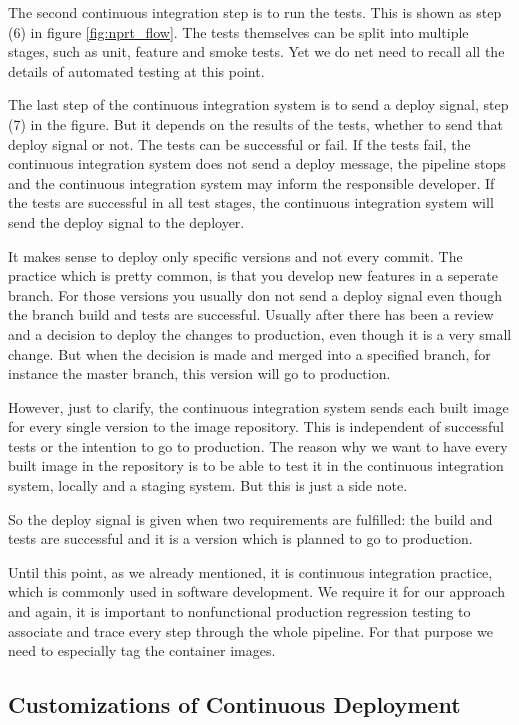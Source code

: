 The second continuous integration step is to run the tests. This is shown as step (6) in
figure \ref{fig:nprt_flow}. The tests themselves can be split into multiple stages, such
as unit, feature and smoke tests. Yet we do net need to recall all the details of
automated testing at this point.

The last step of the continuous integration system is to send a deploy signal, step (7) in
the figure. But it depends on the results of the tests, whether to send that deploy signal
or not. The tests can be successful or fail. If the tests fail, the continuous integration
system does not send a deploy message, the pipeline stops and the continuous integration
system may inform the responsible developer. If the tests are successful in all test
stages, the continuous integration system will send the deploy signal to the deployer.

It makes sense to deploy only specific versions and not every commit. The practice which
is pretty common, is that you develop new features in a seperate branch. For those
versions you usually don not send a deploy signal even though the branch build and tests
are successful. Usually after there has been a review and a decision to deploy the changes
to production, even though it is a very small change. But when the decision is made and
merged into a specified branch, for instance the master branch, this version will go to
production.

However, just to clarify, the continuous integration system sends each built image for
every single version to the image repository. This is independent of successful tests or
the intention to go to production. The reason why we want to have every built image in the
repository is to be able to test it in the continuous integration system, locally and a
staging system. But this is just a side note.

So the deploy signal is given when two requirements are fulfilled: the build and tests are
successful and it is a version which is planned to go to production.

Until this point, as we already mentioned, it is continuous integration practice, which is
commonly used in software development. We require it for our approach and again, it is
important to nonfunctional production regression testing to associate and trace every step
through the whole pipeline. For that purpose we need to especially tag the container
images.

\subsection{Customizations of Continuous Deployment}

